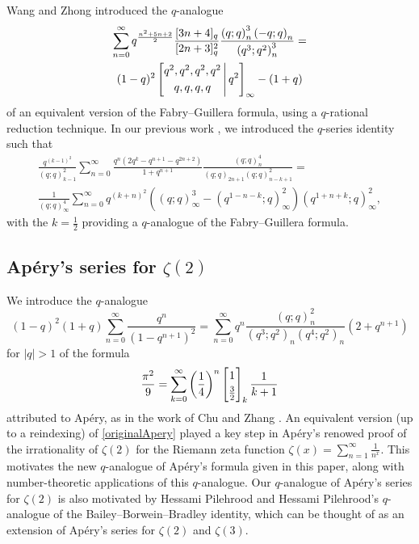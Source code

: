 \documentclass[12pt]{article}
\begin{document}
 Wang and Zhong \cite{WangZhong2023} introduced the $q$-analogue 
\begin{multline*}
 \sum_{n=0}^{\infty} q^{\frac{n^2 + 5n+2}{2}} \frac{ [3n+4]_{q} }{ [2n+3]_{q}^{2} } 
 \frac{ \left( q;q \right)_{n}^{3} \left( -q;q \right)_{n} }{ \left( q^{3};q^{2} \right)_{n}^{3} } 
 = \\ (1-q)^2 \left[ \begin{matrix} 
 q^2, q^2, q^2, q^2 \vspace{1mm} \\ 
 q, q, q, q \end{matrix} \, \Bigg| \, q^{2} \right]_{\infty} - (1+q) 
\end{multline*}
 of an equivalent version of the Fabry--Guillera formula, using a $q$-rational reduction technique. 
 In our previous work \cite{Campbell2025further}, 
 we introduced 
 the $q$-series identity such that 
\begin{multline*} 
 \frac{q^{(k-1)^2}}{(q;q)_{k-1}^2} \sum_{n=0}^{\infty} 
 \frac{q^{n} \left(2 q^k-q^{n+1}-q^{2 n+2}\right)}{1+q^{n+1}} 
 \frac{(q;q)_n^4}{ (q;q)_{2 n+1} (q;q)_{n-k+1}^2} = \\ 
 \frac{1}{(q;q)_{\infty }^4} \sum_{n=0}^{\infty} q^{(k+n)^2} \left((q;q)_{\infty }^3-\left(q^{1-n - 
 k};q\right)_{\infty }^2\right) \left(q^{1+n+k};q\right)_{\infty }^2, 
\end{multline*}
 with the $k = \frac{1}{2}$ providing a $q$-analogue of the Fabry--Guillera formula. 

\subsection{Ap\'{e}ry's series for $\zeta(2)$}\label{subApery}
 We introduce the $q$-analogue $$ (1-q)^2 (1+q) \sum_{n=0}^{\infty} 
 \frac{q^n}{(1-q^{n+1})^2} = \sum_{n=0}^{\infty} q^{n} 
 \frac{ (q;q)_{n}^{2} }{ (q^3;q^2)_{n} (q^4;q^2)_{n} } 
 (2+q^{n+1}) $$
 for $|q| > 1$ 
 of the formula 
\begin{equation}\label{originalApery}
 \frac{\pi^2}{9} = 
 \sum_{k = 0}^{\infty} 
 \left( \frac{1}{4} \right)^{n} \left[ \begin{matrix} 
 1 
 \vspace{1mm} \\ 
 \frac{3}{2} 
 \end{matrix} \right]_{k} \frac{1}{k+1} 
 \end{equation}
 attributed to Ap\'{e}ry, as in the work of Chu and Zhang \cite[Example 74]{ChuZhang2014}. An equivalent version (up to a reindexing) of 
 \eqref{originalApery} played a key step in Ap\'{e}ry's renowed proof \cite{Apery1979,vanderPoorten197879} of the irrationality of 
 $\zeta(2)$ for the Riemann zeta function $\zeta(x) = \sum_{n=1}^{\infty} \frac{1}{n^x}$. This motivates the new $q$-analogue of
 Ap\'{e}ry's formula given in this paper,  along with number-theoretic applications of this $q$-analogue.  Our $q$-analogue of Ap\'{e}ry's  
 series for $\zeta(2)$ is also motivated by Hessami Pilehrood and Hessami Pilehrood's   $q$-analogue  
 \cite{HessamiPilehroodHessamiPilehrood2011} of the Bailey--Borwein--Bradley   identity, which can be thought of as an extension of  
 Ap\'{e}ry's series for $\zeta(2)$ and $\zeta(3)$. 
\end{document}
